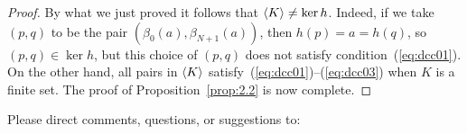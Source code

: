 \begin{proof}
    \medskip
  By what we just proved it follows that 
  $\langle K\rangle \neq \ker h$. Indeed, if we take $(p, q)$ to be 
  the pair $(\beta_0(a), \beta_{N+1}(a))$, then  $h(p) = a = h(q)$, 
  so $(p,q) \in \ker h$, but this choice of $(p,q)$ does not satisfy 
  condition~(\ref{eq:dcc01}). On 
  the other hand, all pairs in $\langle K\rangle$ 
  satisfy~(\ref{eq:dcc01})--(\ref{eq:dcc03}) when $K$ is a finite set.   The 
  proof of Proposition~\ref{prop:2.2} is now complete.
\end{proof}

\bigskip

% 
% 



\bigskip
Please direct comments, questions, or suggestions to:



